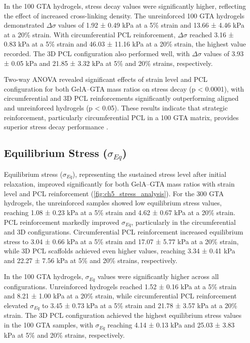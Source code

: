 In the 100 GTA hydrogels, stress decay values were significantly higher, reflecting the effect of increased cross-linking density. The unreinforced 100 GTA hydrogels demonstrated $\Delta\sigma$ values of 1.92 ± 0.49 kPa at a 5\% strain and 13.66 ± 4.46 kPa at a 20\% strain. With circumferential PCL reinforcement, $\Delta\sigma$ reached 3.16 ± 0.83 kPa at a 5\% strain and 46.03 ± 11.16 kPa at a 20\% strain, the highest value recorded. The 3D PCL configuration also performed well, with $\Delta\sigma$ values of 3.93 ± 0.05 kPa and 21.85 ± 3.32 kPa at 5\% and 20\% strains, respectively.

Two-way ANOVA revealed significant effects of strain level and PCL configuration for both GelA--GTA mass ratios on stress decay (p < 0.0001), with circumferential and 3D PCL reinforcements significantly outperforming aligned and unreinforced hydrogels (p < 0.05). These results indicate that strategic reinforcement, particularly circumferential PCL in a 100 GTA matrix, provides superior stress decay performance \cite{patel2019systematicreview,morejon2020compressiveproperties,norberg2021viscoelasticequilibrium,roberts2011comparativestudy}.

\subsection{Equilibrium Stress ($\sigma_{Eq}$)}

Equilibrium stress ($\sigma_{Eq}$), representing the sustained stress level after initial relaxation, improved significantly for both GelA--GTA mass ratios with strain level and PCL reinforcement (\autoref{fig:ch5_stress_analysis}). For the 300 GTA hydrogels, the unreinforced samples showed low equilibrium stress values, reaching 1.08 ± 0.23 kPa at a 5\% strain and 4.62 ± 0.67 kPa at a 20\% strain. PCL reinforcement markedly improved $\sigma_{Eq}$, particularly in the circumferential and 3D configurations. Circumferential PCL reinforcement increased equilibrium stress to 3.04 ± 0.66 kPa at a 5\% strain and 17.07 ± 5.77 kPa at a 20\% strain, while 3D PCL scaffolds achieved even higher values, reaching 3.34 ± 0.41 kPa and 22.27 ± 7.56 kPa at 5\% and 20\% strains, respectively.

In the 100 GTA hydrogels, $\sigma_{Eq}$ values were significantly higher across all configurations. Unreinforced hydrogels reached 1.52 ± 0.16 kPa at a 5\% strain and 8.21 ± 1.00 kPa at a 20\% strain, while circumferential PCL reinforcement elevated $\sigma_{Eq}$ to 3.45 ± 0.73 kPa at a 5\% strain and 21.78 ± 3.57 kPa at a 20\% strain. The 3D PCL configuration achieved the highest equilibrium stress values in the 100 GTA samples, with $\sigma_{Eq}$ reaching 4.14 ± 0.13 kPa and 25.03 ± 3.83 kPa at 5\% and 20\% strains, respectively.

